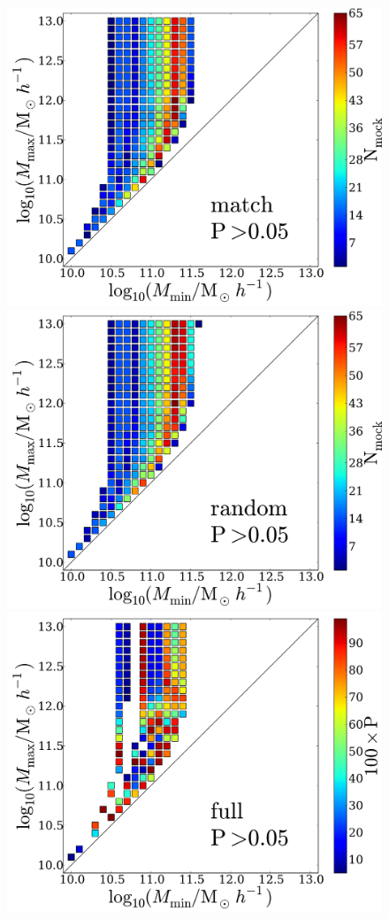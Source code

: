\documentclass[usenatbib]{mn2e}
\begin{document}
\begin{figure}
\begin{center}
\includegraphics[width=0.95\linewidth,angle=0]{./plots/Fig2_match_P5.pdf}\\
\vspace{5mm}
\includegraphics[width=0.95\linewidth,angle=0]{./plots/Fig2_random_P5.pdf}\\
\vspace{5mm}
\includegraphics[width=0.95\linewidth,angle=0]{./plots/Fig2_full_P5.pdf}

\end{center}
\end{figure}
\end{document}
